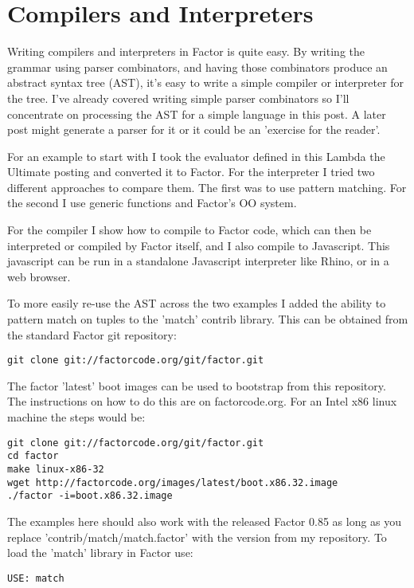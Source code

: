 \chapter{Compilers and Interpreters}\label{compilers}

Writing compilers and interpreters in Factor is quite easy. By writing
the grammar using parser combinators, and having those combinators
produce an abstract syntax tree (AST), it's easy to write a simple
compiler or interpreter for the tree. I've already covered writing
simple parser combinators so I'll concentrate on processing the AST
for a simple language in this post. A later post might generate a
parser for it or it could be an 'exercise for the reader'.

For an example to start with I took the evaluator defined in this
Lambda the Ultimate posting and converted it to Factor. For the
interpreter I tried two different approaches to compare them. The
first was to use pattern matching. For the second I use generic
functions and Factor's OO system.

For the compiler I show how to compile to Factor code, which can then
be interpreted or compiled by Factor itself, and I also compile to
Javascript. This javascript can be run in a standalone Javascript
interpreter like Rhino, or in a web browser.

To more easily re-use the AST across the two examples I added the
ability to pattern match on tuples to the 'match' contrib
library. This can be obtained from the standard Factor git
repository:
\begin{verbatim}
git clone git://factorcode.org/git/factor.git
\end{verbatim}


The factor 'latest' boot images can be used to bootstrap from this
repository. The instructions on how to do this are on
factorcode.org. For an Intel x86 linux machine the steps would be:

\begin{verbatim}
git clone git://factorcode.org/git/factor.git
cd factor
make linux-x86-32
wget http://factorcode.org/images/latest/boot.x86.32.image
./factor -i=boot.x86.32.image
\end{verbatim}

The examples here should also work with the released Factor 0.85 as
long as you replace 'contrib/match/match.factor' with the version from
my repository. To load the 'match' library in Factor use:

\begin{verbatim}
USE: match
\end{verbatim}

